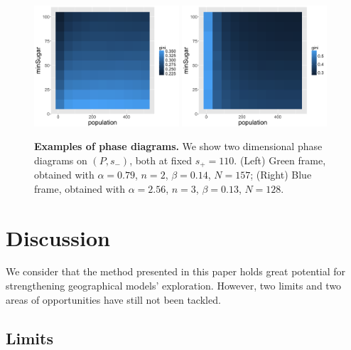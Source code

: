 \documentclass[3p,times,procedia]{elsarticle}
\begin{document}
\begin{figure}
\centering
\includegraphics[width=0.48\textwidth]{figures/phasediagram_id27_maxSugar110}
\includegraphics[width=0.48\textwidth]{figures/phasediagram_id0_maxSugar110}
\caption{\textbf{Examples of phase diagrams.} We show two dimensional phase diagrams on $(P,s_-)$, both at fixed $s_+ = 110$. (Left) Green frame, obtained with $\alpha = 0.79$, $n=2$, $\beta = 0.14$, $N=157$; (Right) Blue frame, obtained with $\alpha = 2.56$, $n=3$, $\beta = 0.13$, $N=128$.}
\label{fig:sugarscape-phasediagrams}
\end{figure}


\section{Discussion}

We consider that the method presented in this paper holds great potential for strengthening geographical models' exploration. However, two limits and two areas of opportunities have still not been tackled. 

\subsection{Limits}
\end{document}
